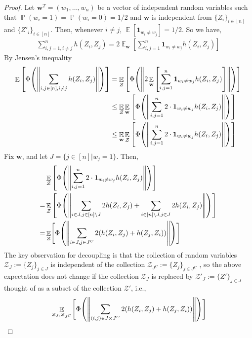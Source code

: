 \documentclass[11pt]{amsart}
\numberwithin{equation}{section}
\numberwithin{equation}{section}
\DeclareMathOperator{\E}{\mathbb{E}}
\DeclareMathOperator{\Pb}{\mathbb{P}}
\newcommand{\cZ}{\mathcal{Z}}
\DeclarePairedDelimiter{\norm}{\lVert}{\rVert}
\DeclarePairedDelimiter{\paren}{(}{)}
\begin{document}
\begin{proof}
    Let $\mathbf{w}^T = (w_1, \ldots, w_n)$ be a vector of independent random variables such that $\Pb(w_i=1)=\Pb(w_i=0)=1/2$ and $\mathbf{w}$ is independent from $\{ Z_i \}_{i \in [n]}$  and $\{ Z'_i \}_{i \in [n]}$. Then, whenever $i\neq j$, $\E[\mathbf{1}_{w_i \neq w_{j}}] = 1/2$. So we have, 
    \begin{align*}
        \sum_{i,j =1, i \neq j}^n h(Z_i, Z_j) = 2\E_{\mathbf{w}} \left[  \sum_{i,j =1}^n \mathbf{1}_{w_i \neq w_{j}} h(Z_i, Z_j) \right]
    \end{align*}
    By Jensen's inequality \cite[Lemma 4.5, p.86]{kallenberg2021foundations}
    \begin{align*}
        \E \left[ \Phi\paren*{\norm*{ \sum_{i,j \in [n] , i \neq j} h(Z_i, Z_j)}} \right] &= \E_{\cZ} \left[ \Phi\paren*{ \norm*{ 2\E_{\mathbf{w}} \left[  \sum_{i,j =1}^n \mathbf{1}_{w_i \neq w_{j}} h(Z_i, Z_j) \right] }} \right] \\
        &\le \E_{\cZ} \E_{\mathbf{w}} \left[ \Phi\paren*{ \norm*{  \sum_{i,j =1}^n 2 \cdot\mathbf{1}_{w_i \neq w_{j}} h(Z_i, Z_j)  }} \right] \\
        &\le  \E_{\mathbf{w}} \E_{\cZ} \left[ \Phi\paren*{ \norm*{  \sum_{i,j =1}^n 2 \cdot\mathbf{1}_{w_i \neq w_{j}} h(Z_i, Z_j)  }} \right] \\
    \end{align*}
Fix $\mathbf{w}$, and let $J = \{ j \in [n] | w_j=1 \}$. Then,
\begin{align*}
    &\E_{\cZ} \left[ \Phi\paren*{ \norm*{  \sum_{i,j =1}^n 2 \cdot\mathbf{1}_{w_i \neq w_{j}} h(Z_i, Z_j)  }} \right]  \\ 
    = &\E_{\cZ} \left[ \Phi\paren*{ \norm*{  \sum_{i \in J, j \in [n]\backslash J } 2 h(Z_i, Z_j) +  \sum_{ i \in [n]\backslash J, j \in J } 2 h(Z_i, Z_j) }} \right] \\
    = &\E_{\cZ} \Biggl[ \Phi\paren*{ \norm*{  \sum_{i \in J, j \in J^C } 2 \paren*{h(Z_i, Z_j)+h(Z_j,Z_i)} }}\Biggr] \\
\end{align*}
The key observation for decoupling is that the collection of random variables $ \mathcal{Z}_J := \{ Z_j \}_{ j\in J}$ is independent of the collection $\mathcal{Z}_{J^C} := \{ Z_j \}_{j\in J^C}$
, so the above expectation does not change if the collection $ \mathcal{Z}_J$ is replaced by $\mathcal{Z}'_J :=\{Z' \}_{ j\in J}$ thought of as a subset of the collection $\cZ'$, i.e.,
\begin{align*}
    &\E_{\mathcal{Z}_J, \mathcal{Z}_{J^C} } \Biggl[ \Phi\paren*{ \norm*{  \sum_{(i,j) \in J \times J^C } 2 (h(Z_i, Z_j)+h(Z_j,Z_i)) }}\Biggr] \\

\end{align*}
\end{proof}
\end{document}
